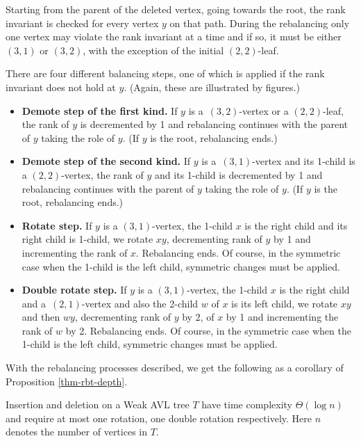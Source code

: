Starting from the parent of the deleted vertex, going towards the root, the rank invariant is checked for every vertex $y$ on that path.  During the rebalancing only one vertex may violate the rank invariant at a time and if so, it must be either $(3,1)$ or $(3,2)$, with the exception of the initial $(2,2)$-leaf.

There are four different balancing steps, one of which is applied if the rank invariant does not hold at $y$. (Again, these are illustrated by figures.)
\begin{itemize}
	\item \textbf{Demote step of the first kind.} If $y$ is a~$(3,2)$-vertex or a $(2,2)$-leaf, the rank of $y$ is decremented by 1 and rebalancing continues with the parent of $y$ taking the role of $y$. (If $y$ is the root, rebalancing ends.)
	\item \textbf{Demote step of the second kind.} If $y$ is a~$(3,1)$-vertex and its 1-child is a $(2,2)$-vertex, the rank of $y$ and its 1-child is decremented by 1 and rebalancing continues with the parent of $y$ taking the role of $y$. (If $y$ is the root, rebalancing ends.)
	\item \textbf{Rotate step.} If $y$ is a $(3,1)$-vertex, the 1-child $x$ is the right child and its right child is 1-child, we rotate $xy$, decrementing rank of $y$ by 1 and incrementing the rank of $x$. Rebalancing ends. Of course, in the symmetric case when the 1-child is the left child, symmetric changes must be applied.
	\item \textbf{Double rotate step.} If $y$ is a $(3,1)$-vertex, the 1-child $x$ is the right child and a~$(2,1)$-vertex and also the 2-child $w$ of $x$ is its left child, we rotate $xy$ and then $wy$, decrementing rank of $y$ by 2, of $x$ by 1 and incrementing the rank of $w$ by 2. Rebalancing ends. Of course, in the symmetric case when the 1-child is the left child, symmetric changes must be applied.
\end{itemize}









With the rebalancing processes described, we get the following as a corollary of Proposition \ref{thm-rbt-depth}.

\begin{prop}
Insertion and deletion on a Weak AVL tree $T$ have time complexity $\Theta(\log n)$ and require at most one rotation, one double rotation respectively. Here $n$ denotes the number of vertices in $T$.
\end{prop}

